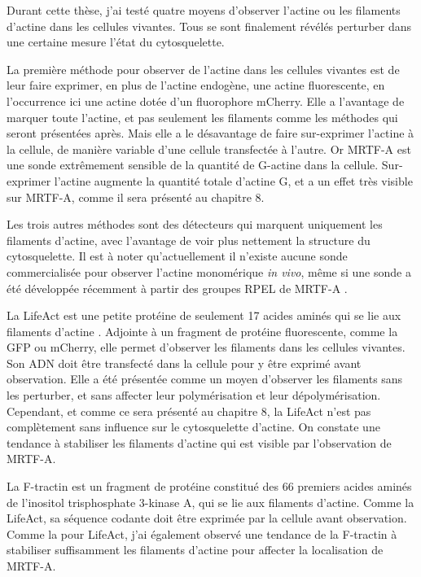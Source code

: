 Durant cette thèse, j'ai testé quatre moyens d'observer l'actine ou les filaments d'actine dans les cellules vivantes. Tous se sont finalement révélés perturber dans une certaine mesure l'état du cytosquelette. 

La première méthode pour observer de l'actine dans les cellules vivantes est de leur faire exprimer, en plus de l'actine endogène, une actine fluorescente, en l'occurrence ici une actine dotée d'un fluorophore mCherry. 
Elle a l'avantage de marquer toute l'actine, et pas seulement les filaments comme les méthodes qui seront présentées après. 
Mais elle a le désavantage de faire sur-exprimer l'actine à la cellule, de manière variable d'une cellule transfectée à l'autre. 
Or MRTF-A est une sonde extrêmement sensible de la quantité de G-actine dans la cellule.  Sur-exprimer l'actine augmente la quantité totale d'actine G, et a un effet très visible sur MRTF-A, comme il sera présenté au chapitre 8. 

Les trois autres méthodes sont des détecteurs qui marquent uniquement les filaments d'actine, avec l'avantage de voir plus nettement la structure du cytosquelette. Il est à noter qu'actuellement il n'existe aucune sonde commercialisée pour observer l'actine monomérique \textit{in vivo}, même si une sonde a été développée récemment à partir des groupes RPEL de MRTF-A \parencite{belin_visualization_2013}. 

La LifeAct est une petite protéine de seulement 17 acides aminés qui se lie aux filaments d'actine \parencite{riedl_lifeact:_2008}. Adjointe à un fragment de protéine fluorescente, comme la GFP ou mCherry, elle permet d'observer les filaments dans les cellules vivantes.  Son ADN doit être transfecté dans la cellule pour y être exprimé avant observation. Elle a été présentée comme un moyen d'observer les filaments sans les perturber, et sans affecter leur polymérisation et leur dépolymérisation. Cependant, et comme ce sera présenté au chapitre 8, la LifeAct n'est pas complètement sans influence sur le cytosquelette d'actine. On constate une tendance à stabiliser les filaments d'actine qui est visible par l'observation de MRTF-A. 

La F-tractin \parencite{johnson_neuronal_2009} est un fragment de protéine constitué des 66 premiers acides aminés de l'inositol trisphosphate 3-kinase A, qui se lie aux filaments d'actine. Comme la LifeAct, sa séquence codante doit être exprimée par la cellule avant observation. Comme la pour LifeAct, j'ai également observé une tendance de la F-tractin à stabiliser suffisamment les filaments d'actine pour affecter la localisation de MRTF-A. 

